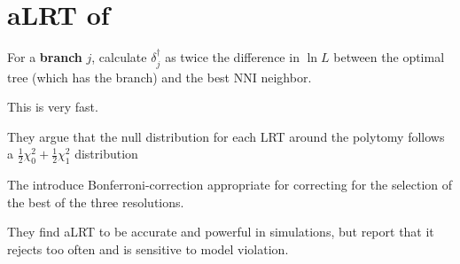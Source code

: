 \documentclass[landscape]{foils}
\begin{document}
\myNewSlide
 


\myNewSlide
 

\myNewSlide
\section*{aLRT of \citet{AnisimovaG2006}}
\begin{compactitem}
	\item For a {\bf branch} $j$, calculate $\delta_{j}^{\dag}$ as twice the difference in $\ln L$ between the optimal tree (which has the branch) and the best NNI neighbor.
	\item This is very fast.
	\item They argue that the null distribution for each LRT around the polytomy follows a $\frac{1}{2}\chi_0^2 + \frac{1}{2}\chi_1^2$ distribution
	\item The introduce Bonferroni-correction appropriate for correcting for the selection of the best of the three resolutions.
	\item They find aLRT to be accurate and powerful in simulations, but \citet{AnisimovaGDDG2011} report that it rejects too often and is sensitive to model violation.
\end{compactitem}
\end{document}
